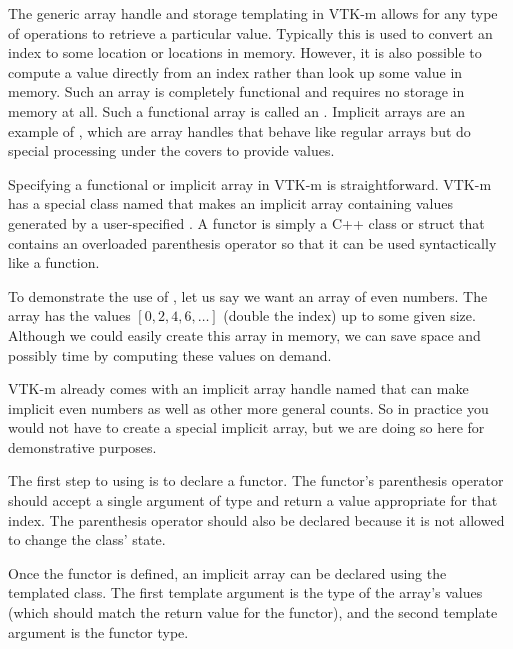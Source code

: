 The generic array handle and storage templating in VTK-m allows for
any type of operations to retrieve a particular value. Typically this is
used to convert an index to some location or locations in memory. However,
it is also possible to compute a value directly from an index rather than
look up some value in memory. Such an array is completely functional and
requires no storage in memory at all. Such a functional array is called an
. Implicit arrays are an example of
, which are array handles that behave like
regular arrays but do special processing under the covers to provide
values.

Specifying a functional or implicit array in VTK-m is straightforward.
VTK-m has a special class named  that makes
an implicit array containing values generated by a user-specified
.  A functor is simply a C++ class or
struct that contains an overloaded parenthesis operator so that it can be
used syntactically like a function.

To demonstrate the use of , let us say
we want an array of even numbers. The array has the values
$[0,2,4,6,\ldots]$ (double the index) up to some given size. Although we
could easily create this array in memory, we can save space and possibly
time by computing these values on demand.

\begin{didyouknow}
  VTK-m already comes with an implicit array handle named
   that can make implicit even numbers as
  well as other more general counts. So in practice you would not have to
  create a special implicit array, but we are doing so here for
  demonstrative purposes.
\end{didyouknow}

The first step to using  is to declare
a functor. The functor's parenthesis operator should accept a single
argument of type  and return a value appropriate for that index.
The parenthesis operator should also be declared  because
it is not allowed to change the class' state.


Once the functor is defined, an implicit array can be declared using the
templated  class. The first template argument
is the type of the array's values (which should match the return value for
the functor), and the second template argument is the functor type.

